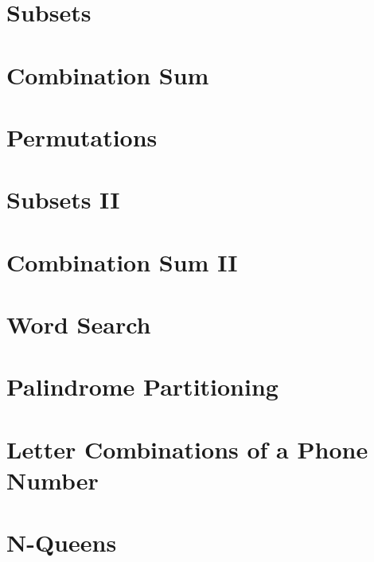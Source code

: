 \documentclass[12pt,letterpaper]{book}
\theoremstyle{definition}
\theoremstyle{remark}
\begin{document}
\section{Subsets}


\section{Combination Sum}


\section{Permutations}


\section{Subsets II}


\section{Combination Sum II}


\section{Word Search}


\section{Palindrome Partitioning}


\section{Letter Combinations of a Phone Number}


\section{N-Queens}

\end{document}
